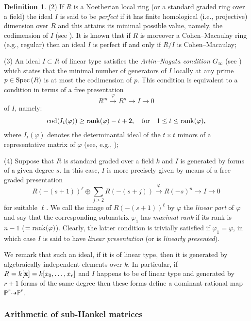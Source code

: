 \documentclass[11pt]{article}   %
\theoremstyle{definition}
\newtheorem{Definition}[Theorem]{Definition}
\numberwithin{Theorem}{section} \numberwithin{equation}{section}
\newcommand{\rar}{\rightarrow}
\newcommand{\lar}{\longrightarrow}
\newcommand{\xx}{{\bf x}}
\def\spec#1{{\rm Spec}\, (#1)}
\newcommand{\p}{{\mathbb P}}
\begin{document}
{\begin{Definition}
(2) If $R$ is a Noetherian local ring (or a standard graded ring
over a field) the ideal $I$ is said to be {\it perfect\/} if it has
finite homological (i.e., projective) dimension over $R$ and this
attains its minimal possible value, namely, the codimension of $I$
(see \cite[p. 485]{Eisenbook}). It is known that if $R$ is moreover
a Cohen--Macaulay ring (e.g., regular) then an ideal $I$ is perfect
if and only if $R/I$ is Cohen--Macaulay{\rm ;}

(3) An ideal $I\subset R$ of linear type satisfies  the {\it
Artin--Nagata condition $G_{\infty}$\/}  (see \cite{AN}) which states
that the minimal number of generators of $I$ locally at any prime
$p\in \spec R$ is at most the codimension of $p$. This condition is
equivalent to a condition in terms of a free presentation
$$R^m\stackrel{\varphi}{\lar} R^n \lar I \lar 0 $$
of $I$, namely:
\begin{equation}\label{f1}
{\rm cod} (I_t(\varphi))\geq {\rm rank}(\varphi)-t+2,\quad \mbox{\rm
for}\quad 1\leq t\leq {\rm rank}(\varphi),
\end{equation}
where $I_t(\varphi)$ denotes the determinantal ideal of the $t\times
t$ minors of a representative matrix of $\varphi$
 (see, e.g., \cite[{
Section} 1.3]{wolmer}){\rm ;}

(4) Suppose that $R$ is standard graded over a field $k$ and $I$ is
 generated by forms of a given degree $s$. In this
case, $I$ is more precisely given by means of a free graded
presentation
$$R(-(s+1))^{\ell}\oplus\sum_{j\geq 2} R(-(s+j)) \stackrel{\varphi}{\lar} R(-s)^n\rar
I\rar 0$$
 for suitable $\ell$.
We call the image of $R(-(s+1))^{\ell}$ by $\varphi$ the {\it linear
part\/} of $\varphi$ and say that the corresponding submatrix
$\varphi_1$  has {\it maximal rank\/} if its rank is $n-1$ ($={\rm
rank}(\varphi)$). Clearly, the latter condition is trivially
satisfied if $\varphi_1=\varphi$, in which case $I$ is said to have
{\it linear presentation\/} (or is {\it linearly presented\/}).

We remark that such an ideal, if it is of linear type, then it is
generated by algebraically independent elements over $k$. In
particular, if $R=k[\xx]=k[x_0,\ldots,x_r]$ and $I$ happens to be of
linear type and generated by $r+1$ forms of the same degree then
these forms define a dominant rational map $\p^r\dasharrow \p^r$.
\end{Definition}
\subsubsection{Arithmetic of sub-Hankel matrices}


}
\end{document}
